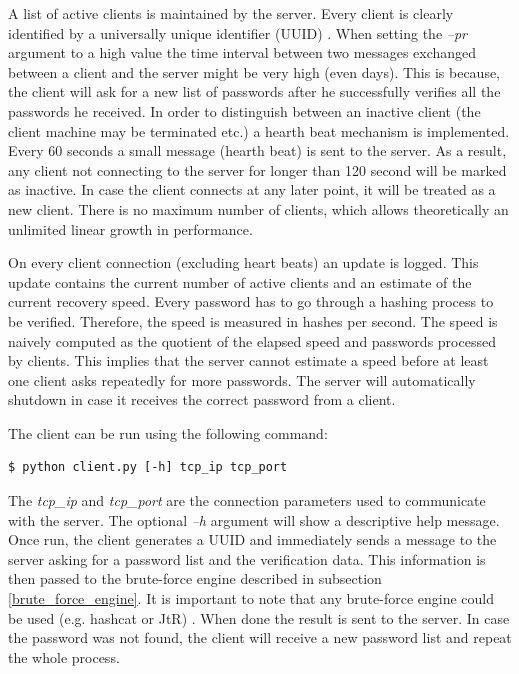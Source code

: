 \documentclass[11pt,oneside]{fithesis2}
\begin{document}
A list of active clients is maintained by the server. Every client is clearly identified by a universally unique identifier (UUID) \cite{rfc4122}. When setting the \textit{–pr} argument to a high value the time interval between two messages exchanged between a client and the server might be very high (even days). This is because, the client will ask for a new list of passwords after he successfully verifies all the passwords he received. In order to distinguish between an inactive client (the client machine may be terminated etc.) a hearth beat mechanism is implemented. Every 60 seconds a small message (hearth beat) is sent to the server. As a result, any client not connecting to the server for longer than 120 second will be marked as inactive. In case the client connects at any later point, it will be treated as a new client. There is no maximum number of clients, which allows theoretically an unlimited linear growth in performance.

On every client connection (excluding heart beats) an update is logged. This update contains the current number of active clients and an estimate of the current recovery speed. Every password has to go through a hashing process to be verified. Therefore, the speed is measured in hashes per second. The speed is naively computed as the quotient of the elapsed speed and passwords processed by clients. This implies that the server cannot estimate a speed before at least one client asks repeatedly for more passwords. The server will automatically shutdown in case it receives the correct password from a client.

The client can be run using the following command:

\begin{lstlisting}
$ python client.py [-h] tcp_ip tcp_port 
\end{lstlisting}

The \textit{tcp\_ip} and \textit{tcp\_port} are the connection parameters used to communicate with the server. The optional \textit{–h} argument will show a descriptive help message.
Once run, the client generates a UUID and immediately sends a message to the server asking for a password list and the verification data. This information is then passed to the brute-force engine described in subsection \ref{brute_force_engine}. It is important to note that any brute-force engine could be used (e.g. hashcat or JtR) \cite{hashcat, jtr}. When done the result is sent to the server. In case the password was not found, the client will receive a new password list and repeat the whole process.
\end{document}

